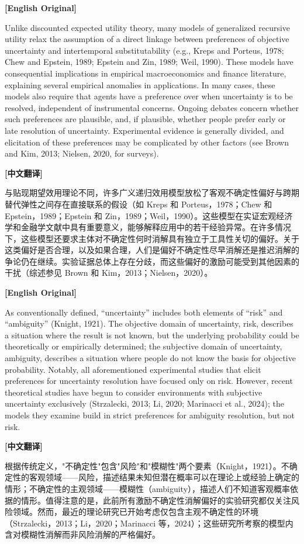 \documentclass[12pt,a4paper]{ctexart}
\newenvironment{original}{%
  \par\medskip\noindent\textbf{[English Original]}\par\smallskip
  \color{black}\small
}{%
  \par\medskip
}
\newenvironment{translation}{%
  \par\noindent\textbf{[中文翻译]}\par\smallskip
  \color{blue}\small
}{%
  \par\bigskip
}
\theoremstyle{definition}
\theoremstyle{remark}
\begin{document}
\begin{original}
Unlike discounted expected utility theory, many models of generalized recursive utility relax the assumption of a direct linkage between preferences of objective uncertainty and intertemporal substitutability (e.g., Kreps and Porteus, 1978; Chew and Epstein, 1989; Epstein and Zin, 1989; Weil, 1990). These models have consequential implications in empirical macroeconomics and finance literature, explaining several empirical anomalies in applications. In many cases, these models also require that agents have a preference over when uncertainty is to be resolved, independent of instrumental concerns. Ongoing debates concern whether such preferences are plausible, and, if plausible, whether people prefer early or late resolution of uncertainty. Experimental evidence is generally divided, and elicitation of these preferences may be complicated by other factors (see Brown and Kim, 2013; Nielsen, 2020, for surveys).
\end{original}
\begin{translation}
与贴现期望效用理论不同，许多广义递归效用模型放松了客观不确定性偏好与跨期替代弹性之间存在直接联系的假设（如 Kreps 和 Porteus，1978；Chew 和 Epstein，1989；Epstein 和 Zin，1989；Weil，1990）。这些模型在实证宏观经济学和金融学文献中具有重要意义，能够解释应用中的若干经验异常。在许多情况下，这些模型还要求主体对不确定性何时消解具有独立于工具性关切的偏好。关于这类偏好是否合理，以及如果合理，人们是偏好不确定性尽早消解还是推迟消解的争论仍在继续。实验证据总体上存在分歧，而这些偏好的激励可能受到其他因素的干扰（综述参见 Brown 和 Kim，2013；Nielsen，2020）。
\end{translation}

\begin{original}
As conventionally defined, ``uncertainty'' includes both elements of ``risk'' and ``ambiguity'' (Knight, 1921). The objective domain of uncertainty, risk, describes a situation where the result is not known, but the underlying probability could be theoretically or empirically determined; the subjective domain of uncertainty, ambiguity, describes a situation where people do not know the basis for objective probability. Notably, all aforementioned experimental studies that elicit preferences for uncertainty resolution have focused only on risk. However, recent theoretical studies have begun to consider environments with subjective uncertainty exclusively (Strzalecki, 2013; Li, 2020; Marinacci et al., 2024); the models they examine build in strict preferences for ambiguity resolution, but not risk.
\end{original}
\begin{translation}
根据传统定义，"不确定性"包含"风险"和"模糊性"两个要素（Knight，1921）。不确定性的客观领域——风险，描述结果未知但潜在概率可以在理论上或经验上确定的情形；不确定性的主观领域——模糊性（ambiguity），描述人们不知道客观概率依据的情形。值得注意的是，此前所有激励不确定性消解偏好的实验研究都仅关注风险领域。然而，最近的理论研究已开始考虑仅包含主观不确定性的环境（Strzalecki，2013；Li，2020；Marinacci 等，2024）；这些研究所考察的模型内含对模糊性消解而非风险消解的严格偏好。
\end{translation}
\end{document}
